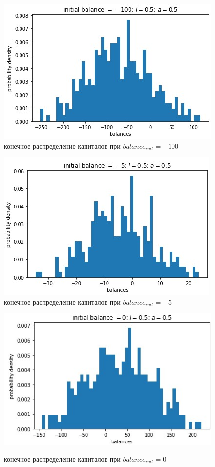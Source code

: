 \documentclass{article}
\begin{document}
\null\newpage
\begin{figure}[H]
	\begin{minipage}[h]{0.49\linewidth}
		\centering
		\includegraphics[width=1.0\linewidth]{assets/init_balance_minus_100.jpg}
		конечное распределение капиталов \newline при $balance_{init} = -100$
	\end{minipage}
	\hfill
	\begin{minipage}[h]{0.49\linewidth}
		\centering
		\includegraphics[width=1.0\linewidth]{assets/init_balance_minus_5.jpg}
		конечное распределение капиталов \newline при $balance_{init} = -5$
	\end{minipage}
\end{figure}
\begin{figure}[H]
		\centering
		\includegraphics[width=0.5\linewidth]{assets/init_balance_0.jpg}
		\begin{center}
		конечное распределение капиталов при $balance_{init} = 0$
		\end{center}
\end{figure}
\end{document}
